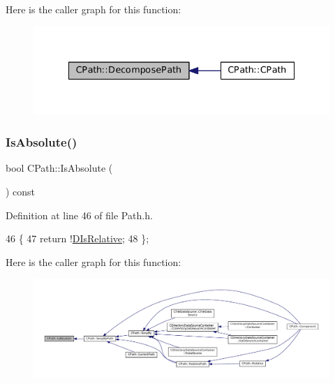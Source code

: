 Here is the caller graph for this function\+:\nopagebreak
\begin{figure}[H]
\begin{center}
\leavevmode
\includegraphics[width=335pt]{classCPath_aae05f3c3502e92bf68d5ce71264c7bb9_icgraph}
\end{center}
\end{figure}
\hypertarget{classCPath_a613d8d4c4b72dba9fc8b6e487f583d7d}{}\label{classCPath_a613d8d4c4b72dba9fc8b6e487f583d7d} 
\subsubsection{\texorpdfstring{Is\+Absolute()}{IsAbsolute()}}
{\footnotesize\ttfamily bool C\+Path\+::\+Is\+Absolute (\begin{DoxyParamCaption}{ }\end{DoxyParamCaption}) const\hspace{0.3cm}{\ttfamily [inline]}}



Definition at line 46 of file Path.\+h.


\begin{DoxyCode}
46                                \{
47             \textcolor{keywordflow}{return} !\hyperlink{classCPath_af705ff149bb2281c67afb84fff550eb9}{DIsRelative};  
48         \};
\end{DoxyCode}
Here is the caller graph for this function\+:\nopagebreak
\begin{figure}[H]
\begin{center}
\leavevmode
\includegraphics[width=350pt]{classCPath_a613d8d4c4b72dba9fc8b6e487f583d7d_icgraph}
\end{center}
\end{figure}
\hypertarget{classCPath_a59cf4c412366aef121fcbc97339ad13b}{}\label{classCPath_a59cf4c412366aef121fcbc97339ad13b} 
